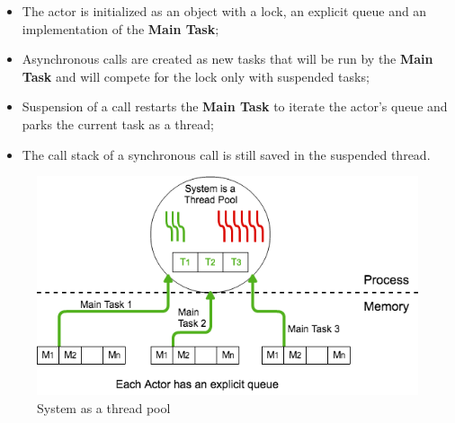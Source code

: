 \begin{itemize}
	\item The actor is initialized as an object with a lock, an explicit queue and an implementation of the \textbf{Main Task};
	\item Asynchronous calls are created as new tasks that will be run by the \textbf{Main Task} and will compete for the lock only with suspended tasks;
	\item Suspension of a call restarts the \textbf{Main Task} to iterate the actor's queue and parks the current task as a thread;
	\item The call stack of a synchronous call is still saved in the suspended thread.
\end{itemize}





\begin{figure}
	\centering
	\includegraphics[scale=0.51]{stp.png}
	\caption{System as a thread pool}
	\label{stp}
	
\end{figure}

